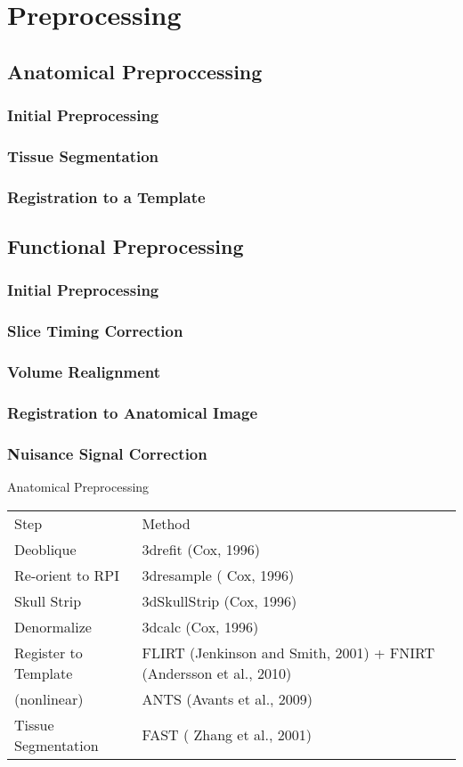 \section*{Preprocessing}
\subsection{Anatomical Preproccessing}
\subsubsection{Initial Preprocessing}
\subsubsection{Tissue Segmentation}
\subsubsection{Registration to a Template}
\subsection{Functional Preprocessing}
\subsubsection{Initial Preprocessing}
\subsubsection{Slice Timing Correction}
\subsubsection{Volume Realignment}
\subsubsection{Registration to Anatomical Image}
\subsubsection{Nuisance Signal Correction}

Anatomical Preprocessing \\

\begin{tabular}{l l}
	\hline
	Step & Method  \\
	Deoblique & 3drefit (Cox, 1996)  \\
	Re-orient to RPI & 3dresample ( Cox, 1996) \\
	Skull Strip & 3dSkullStrip (Cox, 1996) \\
	Denormalize & 3dcalc (Cox, 1996) \\
	Register to Template & FLIRT (Jenkinson and Smith, 2001) + FNIRT (Andersson et al., 2010) \\
	(nonlinear) & ANTS (Avants et al., 2009)  \\
	Tissue Segmentation & FAST ( Zhang et al., 2001)\\ 
	\hline
\end{tabular}

